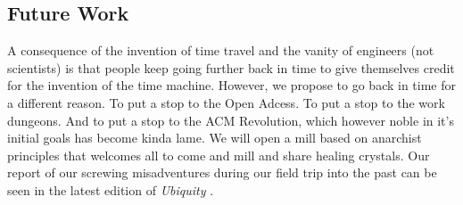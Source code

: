 \subsection{Future Work}
A consequence of the invention of time travel \cite{timetravel} \cite{genesis} \cite{cave} and the vanity
of engineers (not scientists) \cite{sci-shirt} is that people keep going
further back in time to give themselves credit for the invention of the time
machine.
However, we propose to go back in time for a different reason.
To put a stop to the Open Adcess.
To put a stop to the work dungeons.
And to put a stop to the ACM Revolution, which however noble in it's initial
goals has become  kinda lame.
We will open a mill based on anarchist principles that welcomes all to come and
mill and share healing crystals.
Our report of our screwing misadventures during our field trip into the past
can be seen in the latest edition of \textit{Ubiquity} \cite{future-ub}.

